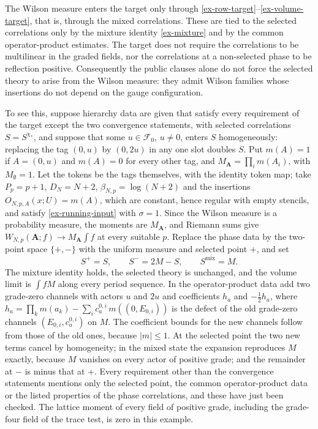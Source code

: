 \begin{remark}
\label{rem:ex-target-adequacy}
The Wilson measure enters the target only through
\eqref{ex-row-target}--\eqref{ex-volume-target}, that is, through the mixed
correlations. These are tied to the selected correlations only by the
mixture identity \eqref{ex-mixture} and by the common operator-product
estimates. The target does not require the correlations to be multilinear in
the graded fields, nor the correlations at a non-selected phase to be
reflection positive. Consequently the public clauses alone do not force the
selected theory to arise from the Wilson measure: they admit Wilson families
whose insertions do not depend on the gauge configuration.

To see this, suppose hierarchy data are given that satisfy every requirement
of the target except the two convergence statements, with selected
correlations \(S=S^{\chi_*}\), and suppose that some \(u\in\mathcal F_0\),
\(u\ne0\), enters \(S\) homogeneously: replacing the tag \((0,u)\) by
\((0,2u)\) in any one slot doubles \(S\). Put \(m(A)=1\) if \(A=(0,u)\) and
\(m(A)=0\) for every other tag, and \(M_{\boldsymbol A}=\prod_im(A_i)\), with
\(M_\emptyset=1\). Let the tokens be the tags themselves, with the identity
token map; take \(P_p=p+1\), \(D_N=N+2\), \(\beta_{N,p}=\log(N+2)\) and the
insertions \(O_{N,p,A}(x;U)=m(A)\), which are constant, hence regular with
empty stencils, and satisfy \eqref{ex-running-input} with \(\sigma=1\).
Since the Wilson measure is a probability measure, the moments are
\(M_{\boldsymbol A}\), and Riemann sums give
\(W_{N,p}(\boldsymbol A;f)\to M_{\boldsymbol A}\int f\) at every suitable
\(p\). Replace the phase data by the two-point space \(\{+,-\}\) with the
uniform measure and selected point \(+\), and set
\[
 S^+=S,\qquad S^-=2M-S,\qquad S^{\mathrm{mix}}=M .
\]
The mixture identity holds, the selected theory is unchanged, and the
volume limit is \(\int fM\) along every period sequence. In the
operator-product data add two grade-zero channels with actors \(u\) and
\(2u\) and coefficients \(h_a\) and \(-\tfrac12h_a\), where
\(h_a=\prod_km(a_k)-\sum_ic^{0,i}_a\,m((0,E_{0,i}))\) is the defect of the
old grade-zero channels \((E_{0,i},c^{0,i}_a)\) on \(M\). The coefficient
bounds for the new channels follow from those of the old ones, because
\(|m|\le1\). At the selected point the two new terms cancel by homogeneity;
in the mixed state the expansion reproduces \(M\) exactly, because \(M\)
vanishes on every actor of positive grade; and the remainder at \(-\) is
minus that at \(+\). Every requirement other than the convergence statements
mentions only the selected point, the common operator-product data or the
listed properties of the phase correlations, and these have just been
checked. The lattice moment of every field of positive grade, including the
grade-four field of the trace test, is zero in this example.


\end{remark}
